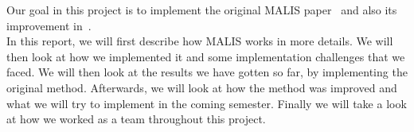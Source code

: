 Our goal in this project is to implement the original MALIS
paper~\cite{turaga_maximin_2009} and also its improvement
in~\cite{funke_large_2019}.\\

In this report, we will first describe how MALIS works in more details. We will
then look at how we implemented it and some implementation challenges that we
faced. We will then look at the results we have gotten so far, by implementing
the original method. Afterwards, we will look at how the method was improved
and what we will try to implement in the coming semester. Finally we will take
a look at how we worked as a team throughout this project.

